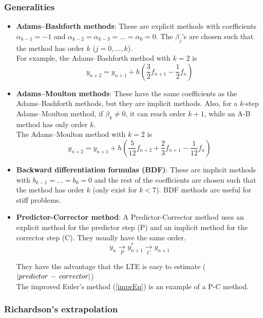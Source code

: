 \subsubsection{Generalities}

\begin{itemize}
    \item \textbf{Adams–Bashforth methods}: These are explicit methods with coefficients $\alpha_{k-1} = -1$ and $\alpha_{k-2} = \alpha_{k-3} = \ldots = \alpha_0 = 0$. The $\beta_j$'s are chosen such that the method has order $k$ ($j = 0, \ldots, k$).\\
    
    For example, the Adams–Bashforth method with $k=2$ is $$y_{n+2} = y_{n+1} + h\left(\frac{3}{2}f_{n+1} - \frac{1}{2}f_n\right)$$
    
    \item \textbf{Adams–Moulton methods}: These have the same coefficients as the Adams–Bashforth methods, but they are implicit methods. Also, for a $k$-step Adams–Moulton method, if $\beta_k \not= 0$, it can reach order $k+1$, while an A-B method has only order $k$.\\
    
    The Adams–Moulton method with $k = 2$ is $$y_{n+2} = y_{n+1} + h\left(\frac{5}{12}f_{n+2} + \frac{2}{3}f_{n+1} - \frac{1}{12}f_n \right)$$
    
    \item \textbf{Backward differentiation formulas (BDF)}: These are implicit methods with $b_{k-1} = \ldots = b_{0} = 0$ and the rest of the coefficients are chosen such that the method has order $k$ (only exist for $k<7$). BDF methods are useful for stiff problems.
    
    \item \textbf{Predictor-Corrector method}: A Predictor-Corrector method uses an explicit method for the predictor step (P) and an implicit method for the corrector step (C). They usually have the same order. 
    $$y_n \underset{P}{\longrightarrow}y_{n+1}^* \underset{C}{\longrightarrow}y_{n+1}$$
    
    They have the advantage that the LTE is easy to estimate ($\left\vert predictor\,-\,corrector \right\vert$)\\
    The improved Euler's method (\ref{imprEu}) is an example of a P-C method.
\end{itemize}

\newpage
\subsubsection{Richardson's extrapolation}


